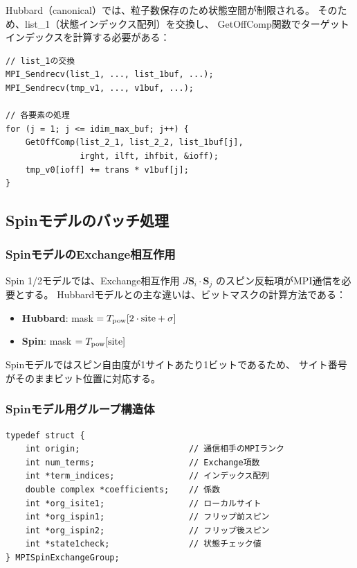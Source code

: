 \documentclass[11pt,a4paper]{article}
\begin{document}
Hubbard（canonical）では、粒子数保存のため状態空間が制限される。
そのため、list\_1（状態インデックス配列）を交換し、
GetOffComp関数でターゲットインデックスを計算する必要がある：

\begin{lstlisting}[caption=Hubbard canonical MPIdoubleの処理]
// list_1の交換
MPI_Sendrecv(list_1, ..., list_1buf, ...);
MPI_Sendrecv(tmp_v1, ..., v1buf, ...);

// 各要素の処理
for (j = 1; j <= idim_max_buf; j++) {
    GetOffComp(list_2_1, list_2_2, list_1buf[j],
               irght, ilft, ihfbit, &ioff);
    tmp_v0[ioff] += trans * v1buf[j];
}
\end{lstlisting}

\subsection{Spinモデルのバッチ処理}

\subsubsection{SpinモデルのExchange相互作用}

Spin 1/2モデルでは、Exchange相互作用 $J \mathbf{S}_i \cdot \mathbf{S}_j$
のスピン反転項がMPI通信を必要とする。
Hubbardモデルとの主な違いは、ビットマスクの計算方法である：

\begin{itemize}
  \item \textbf{Hubbard}: mask $= T_{\rm pow}[2 \cdot \text{site} + \sigma]$
  \item \textbf{Spin}: mask $= T_{\rm pow}[\text{site}]$
\end{itemize}

Spinモデルではスピン自由度が1サイトあたり1ビットであるため、
サイト番号がそのままビット位置に対応する。

\subsubsection{Spinモデル用グループ構造体}

\begin{lstlisting}[caption=MPISpinExchangeGroup構造体]
typedef struct {
    int origin;                      // 通信相手のMPIランク
    int num_terms;                   // Exchange項数
    int *term_indices;               // インデックス配列
    double complex *coefficients;    // 係数
    int *org_isite1;                 // ローカルサイト
    int *org_ispin1;                 // フリップ前スピン
    int *org_ispin2;                 // フリップ後スピン
    int *state1check;                // 状態チェック値
} MPISpinExchangeGroup;
\end{lstlisting}
\end{document}
